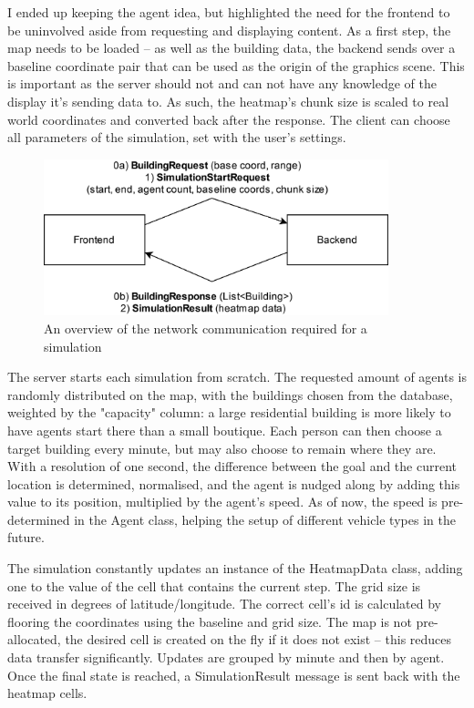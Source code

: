 I ended up keeping the agent idea, but highlighted the need for the frontend to be uninvolved aside from requesting and displaying content. As a first step, the map needs to be loaded -- as well as the building data, the backend sends over a baseline coordinate pair that can be used as the origin of the graphics scene. This is important as the server should not and can not have any knowledge of the display it's sending data to. As such, the heatmap's chunk size is scaled to real world coordinates and converted back after the response. The client can choose all parameters of the simulation, set with the user's settings.
\begin{figure}[h]
    \centering
    \includegraphics[width=100mm, keepaspectratio]{images/simu_network.png}
    \caption{An overview of the network communication required for a simulation\ \label{simu_network}}
\end{figure}

The server starts each simulation from scratch. The requested amount of agents is randomly distributed on the map, with the buildings chosen from the database, weighted by the "capacity" column: a large residential building is more likely to have agents start there than a small boutique. Each person can then choose a target building every minute, but may also choose to remain where they are. With a resolution of one second, the difference between the goal and the current location is determined, normalised, and the agent is nudged along by adding this value to its position, multiplied by the agent's speed. As of now, the speed is pre-determined in the Agent class, helping the setup of different vehicle types in the future.

The simulation constantly updates an instance of the HeatmapData class, adding one to the value of the cell that contains the current step. The grid size is received in degrees of latitude/longitude. The correct cell's id is calculated by flooring the coordinates using the baseline and grid size. The map is not pre-allocated, the desired cell is created on the fly if it does not exist -- this reduces data transfer significantly. Updates are grouped by minute and then by agent. Once the final state is reached, a SimulationResult message is sent back with the heatmap cells.


